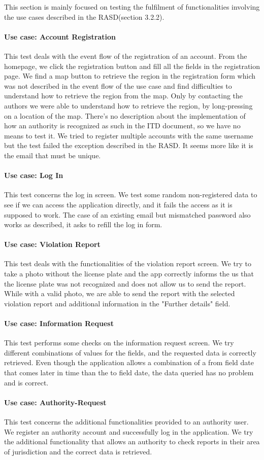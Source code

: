 This section is mainly focused on testing the fulfilment of functionalities involving the use cases described in the RASD(section 3.2.2).
\paragraph{Use case: Account Registration}
This test deals with the event flow of the registration of an account. From the homepage, we click the registration button and fill all the fields in the registration page. We find a map button to retrieve the region in the registration form which was not described in the event flow of the use case and find difficulties to understand how to retrieve the region from the map. Only by contacting the authors we were able to understand how to retrieve the region, by long-pressing on a location of the map. There's no description about the implementation of how an authority is recognized as such in the ITD document, so we have no means to test it. We tried to register multiple accounts with the same username but the test failed the exception described in the RASD. It seems more like it is the email that must be unique.
\paragraph{Use case: Log In} 
This test concerns the log in screen. We test some random non-registered data to see if we can access the application directly, and it fails the access as it is supposed to work. The case of an existing email but mismatched password also works as described, it asks to refill the log in form.
\paragraph{Use case: Violation Report} 
This test deals with the functionalities of the violation report screen. We try to take a photo without the license plate and the app correctly informs the us that the license plate was not recognized and does not allow us to send the report. While with a valid photo, we are able to send the report with the selected violation report and additional information in the "Further details" field.
\paragraph{Use case: Information Request} 
This test performs some checks on the information request screen. We try different combinations of values for the fields, and the requested data is correctly retrieved. Even though the application allows a combination of a from field date that comes later in time than the to field date, the data queried has no problem and is correct.
\paragraph{Use case: Authority-Request}
This test concerns the additional functionalities provided to an authority user. We register an authority account and successfully log in the application. We try the additional functionality that allows an authority to check reports in their area of jurisdiction and the correct data is retrieved.